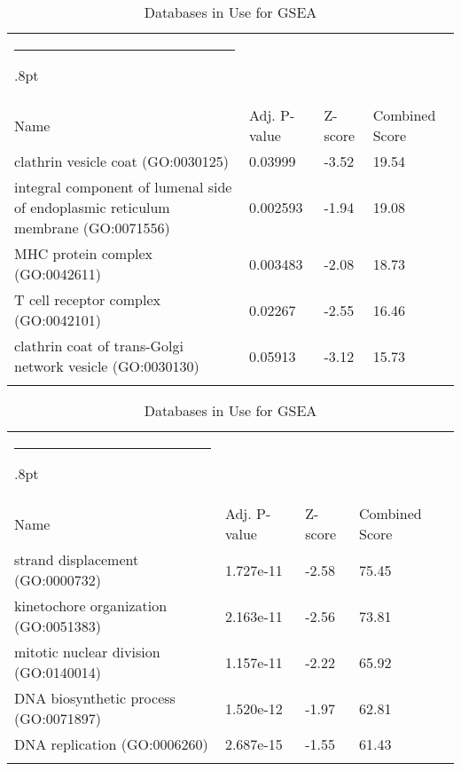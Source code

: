 \documentclass[3p,authoryear,preprint,12pt]{elsarticle}
\makeatletter
\def\hlinewd#1{%
  \noalign{\ifnum0=`}\fi\hrule \@height #1%
  \futurelet\reserved@a\@xhline}
\def\tbltoprule{\hlinewd{.8pt}\\[-12pt]}
\def\tblbottomrule{\noalign{\vspace*{6pt}}\hline\noalign{\vspace*{2pt}}}
\def\tblmidrule{\noalign{\vspace*{6pt}}\hline\noalign{\vspace*{2pt}}}
\makeatother
\begin{document}
\begin{table*}[!htbp]
	\caption{{Databases in Use for GSEA} }
	\label{tw-de478ae31cc6}
	\def\arraystretch{1}
	\ignorespaces 
	\centering 
	\begin{tabulary}{\linewidth}{p{\dimexpr.65\tabcolsep}p{\dimexpr.15\tabcolsep}p{\dimexpr.1\tabcolsep}p{\dimexpr.1\tabcolsep}}
		\tbltoprule Name & Adj. P-value & Z-score & Combined Score\\
		\tblmidrule
clathrin vesicle coat (GO:0030125) & 0.03999 & -3.52 & 19.54 \\
integral component of lumenal side of endoplasmic reticulum membrane (GO:0071556) & 0.002593 & -1.94 & 19.08 \\
MHC protein complex (GO:0042611) & 0.003483 & -2.08 & 18.73 \\
T cell receptor complex (GO:0042101) & 0.02267 & -2.55 & 16.46 \\
clathrin coat of trans-Golgi network vesicle (GO:0030130) & 0.05913 & -3.12 & 15.73 \\
		\tblbottomrule
	\end{tabulary}\par 
\end{table*}
\begin{table*}[!htbp]
	\caption{{Databases in Use for GSEA} }
	\label{tw-de478ae31cc6}
	\def\arraystretch{1}
	\ignorespaces 
	\centering 
	\begin{tabulary}{\linewidth}{p{\dimexpr.65\tabcolsep}p{\dimexpr.15\tabcolsep}p{\dimexpr.1\tabcolsep}p{\dimexpr.1\tabcolsep}}
		\tbltoprule Name & Adj. P-value & Z-score & Combined Score\\
		\tblmidrule
strand displacement (GO:0000732) & 1.727e-11 & -2.58 & 75.45 \\
kinetochore organization (GO:0051383) & 2.163e-11 & -2.56 & 73.81 \\
mitotic nuclear division (GO:0140014) & 1.157e-11 & -2.22 & 65.92 \\
DNA biosynthetic process (GO:0071897) & 1.520e-12 & -1.97 & 62.81 \\
DNA replication (GO:0006260) & 2.687e-15 & -1.55 & 61.43 \\
		\tblbottomrule
	\end{tabulary}\par 
\end{table*}
\end{document}
